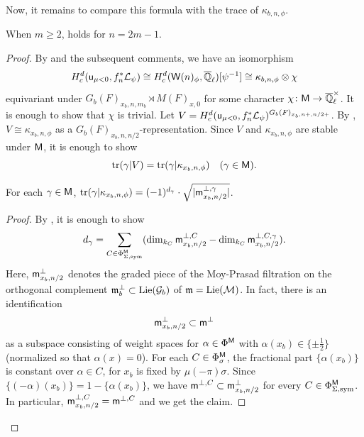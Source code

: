 \documentclass[12pt,reqno]{amsart}
\begin{document}
Now, it remains to compare this formula with the trace of $\kappa_{b, n, \phi}$. 

\begin{prop} \label{prop:cohomology_reduction_odd}
    When $m \geq 2$,  holds for $n = 2m - 1$. 
\end{prop}
\begin{proof}
    By  and the subsequent comments, we have an isomorphism
    \[
        H_c^d({\mathsf{u}}_{\mu < 0}, f_n^*{\mathcal{L}}_{\psi}) \cong H_c^d({\mathsf{W}}(n)_\phi, {\overline{\mathbb{Q}}_\ell})[\psi^{-1}] \cong \kappa_{b, n, \phi} \otimes \chi 
    \]
    equivariant under $G_b(F)_{x_b, n, m_b} \rtimes M(F)_{x, 0}$ for some character $\chi \colon {\mathsf{M}} \to {\overline{\mathbb{Q}}_\ell^\times}$. It is enough to show that $\chi$ is trivial. Let $V = H_c^d({\mathsf{u}}_{\mu < 0}, f_n^*{\mathcal{L}}_{\psi})^{G_b(F)_{x_b, n+, n/2+}}$. By , $V \cong \kappa_{x_b, n, \phi}$ as a $G_b(F)_{x_b, n, n/2}$-representation. Since $V$ and $\kappa_{x_b, n, \phi}$ are stable under ${\mathsf{M}}$, it is enough to show 
    \begin{equation} \label{eq:trace_equality_M_odd}
        {\operatorname{tr}}(\gamma\vert V) = {\operatorname{tr}}(\gamma \vert \kappa_{x_b, n, \phi}) \quad (\gamma \in {\mathsf{M}}). 
    \end{equation}

\begin{lem} \label{lem:trace_for_kappa_odd}
    For each $\gamma \in {\mathsf{M}}$, ${\operatorname{tr}}(\gamma \vert \kappa_{x_b, n, \phi}) = (-1)^{d_\gamma} \cdot \sqrt{\lvert {\mathsf{m}}^{\perp, \gamma}_{x_b, n/2} \rvert}$. 
\end{lem}
\begin{proof}
    By \cite[Theorem 2.27]{Tak26_Yu}, it is enough to show 
    \[
        d_\gamma = \sum_{C \in \Phi_{\Sigma, {\operatorname{sym}}}^{{\mathsf{M}}}} (\dim_{k_C} {\mathsf{m}}_{x_b, n/2}^{\perp, C} - \dim_{k_C} {\mathsf{m}}_{x_b, n/2}^{\perp, C, \gamma}). 
    \]
    Here, ${\mathsf{m}}^\perp_{x_b, n/2}$ denotes the graded piece of the Moy-Prasad filtration on the orthogonal complement ${\mathfrak{m}}_b^\perp \subset {\operatorname{Lie}}({\mathcal{G}}_b)$ of ${\mathfrak{m}} = {\operatorname{Lie}}({\mathcal{M}})$. In fact, there is an identification 
    \[
        {\mathsf{m}}_{x_b, n/2}^\perp \subset {\mathsf{m}}^\perp
    \]
    as a subspace consisting of weight spaces for $\alpha \in \Phi^{{\mathsf{M}}}$ with $\alpha(x_b) \in \{ \pm \tfrac{1}{2} \}$ (normalized so that $\alpha(x) = 0$). For each $C \in \Phi_\sigma^{{\mathsf{M}}}$, the fractional part $\{ \alpha(x_b) \}$ is constant over $\alpha \in C$, for $x_b$ is fixed by $\mu(-\pi)\sigma$. Since $\{ (-\alpha)(x_b) \} = 1 - \{ \alpha(x_b) \}$, we have ${\mathsf{m}}^{\perp, C} \subset {\mathsf{m}}_{x_b, n/2}^\perp$ for every $C \in \Phi_{\Sigma, {\operatorname{sym}}}^{{\mathsf{M}}}$. In particular, ${\mathsf{m}}^{\perp, C}_{x_b, n/2} = {\mathsf{m}}^{\perp, C}$ and we get the claim. 
\end{proof}
    

\end{proof}
\end{document}
